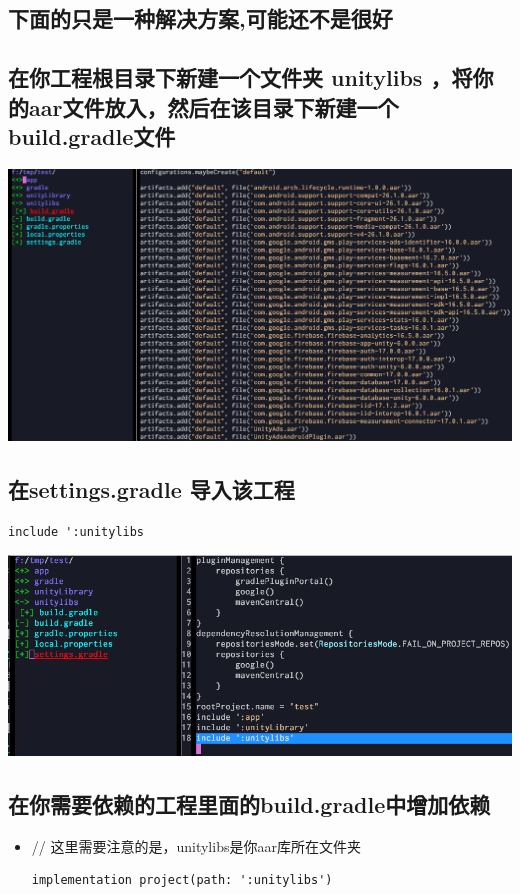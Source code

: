 \documentclass[9pt, b5paper]{article}
\begin{document}
\subsection{下面的只是一种解决方案,可能还不是很好}
\label{sec-7-2}
\subsection{在你工程根目录下新建一个文件夹 \textbf{unitylibs} ，将你的aar文件放入，然后在该目录下新建一个build.gradle文件}
\label{sec-7-3}

\includegraphics[width=.9\linewidth]{./pic/unityToAndroid_20221124_161335.png}
\subsection{在settings.gradle 导入该工程}
\label{sec-7-4}
\begin{verbatim}
include ':unitylibs
\end{verbatim}

\includegraphics[width=.9\linewidth]{./pic/unityToAndroid_20221124_161424.png}
\subsection{在你需要依赖的工程里面的build.gradle中增加依赖}
\label{sec-7-5}
\begin{itemize}
\item // 这里需要注意的是，unitylibs是你aar库所在文件夹
\begin{verbatim}
implementation project(path: ':unitylibs')
\end{verbatim}
\end{itemize}
\end{document}
